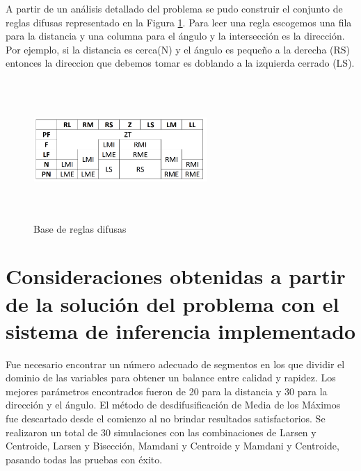 \documentclass[a4paper,10pt]{article}
\begin{document}
		A partir de un análisis detallado del problema se pudo construir el conjunto de reglas difusas representado en la Figura \ref{fig:rules}.
	Para leer una regla escogemos una fila para la distancia y una columna para el ángulo y la intersección es la dirección. Por ejemplo, si la distancia es cerca(N) y el ángulo 		es pequeño a la derecha (RS) entonces la direccion que debemos tomar es doblando a la izquierda cerrado (LS). 
	
	\begin{figure}[!h]
		\begin{center}
			\includegraphics[width=250px, height=200px]{images/rules.jpg}
		\end{center}
		\caption{Base de reglas difusas \label{fig:rules}}
	\end{figure}
	
	
\section{Consideraciones obtenidas a partir de la solución del problema con el sistema de inferencia implementado}\label{sec:4}	

	Fue necesario encontrar un número adecuado de segmentos en los que dividir el dominio de las variables para obtener un balance entre calidad y rapidez. Los mejores parámetros encontrados fueron de 20 para la distancia y 30 para la dirección y el ángulo. El método de desdifusificación de Media de los Máximos fue descartado desde el comienzo al no brindar resultados satisfactorios. Se realizaron un total de 30 simulaciones con las combinaciones de Larsen y Centroide, Larsen y Bisección, Mamdani y Centroide y Mamdani y Centroide, pasando todas las pruebas con éxito.

\label{end}
\end{document}
